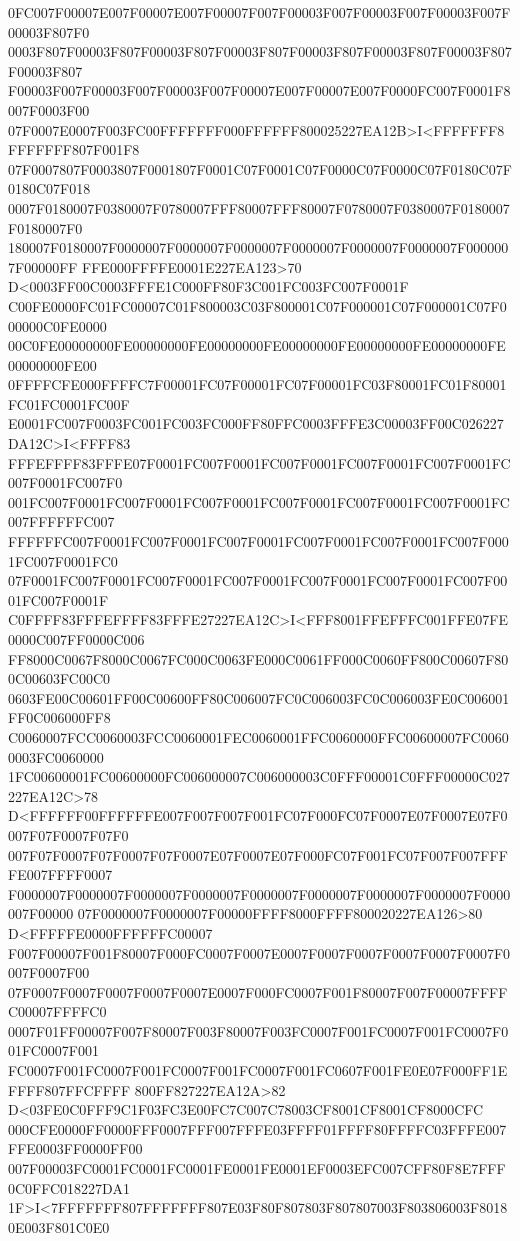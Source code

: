 0FC007F00007E007F00007E007F00007F007F00003F007F00003F007F00003F007F00003F807F0
0003F807F00003F807F00003F807F00003F807F00003F807F00003F807F00003F807F00003F807
F00003F007F00003F007F00003F007F00007E007F00007E007F0000FC007F0001F8007F0003F00
07F0007E0007F003FC00FFFFFFF000FFFFFF800025227EA12B>I<FFFFFFF8FFFFFFF807F001F8
07F0007807F0003807F0001807F0001C07F0001C07F0000C07F0000C07F0180C07F0180C07F018
0007F0180007F0380007F0780007FFF80007FFF80007F0780007F0380007F0180007F0180007F0
180007F0180007F0000007F0000007F0000007F0000007F0000007F0000007F0000007F00000FF
FFE000FFFFE0001E227EA123>70 D<0003FF00C0003FFFE1C000FF80F3C001FC003FC007F0001F
C00FE0000FC01FC00007C01F800003C03F800001C07F000001C07F000001C07F000000C0FE0000
00C0FE00000000FE00000000FE00000000FE00000000FE00000000FE00000000FE00000000FE00
0FFFFCFE000FFFFC7F00001FC07F00001FC07F00001FC03F80001FC01F80001FC01FC0001FC00F
E0001FC007F0003FC001FC003FC000FF80FFC0003FFFE3C00003FF00C026227DA12C>I<FFFF83
FFFEFFFF83FFFE07F0001FC007F0001FC007F0001FC007F0001FC007F0001FC007F0001FC007F0
001FC007F0001FC007F0001FC007F0001FC007F0001FC007F0001FC007F0001FC007FFFFFFC007
FFFFFFC007F0001FC007F0001FC007F0001FC007F0001FC007F0001FC007F0001FC007F0001FC0
07F0001FC007F0001FC007F0001FC007F0001FC007F0001FC007F0001FC007F0001FC007F0001F
C0FFFF83FFFEFFFF83FFFE27227EA12C>I<FFF8001FFEFFFC001FFE07FE0000C007FF0000C006
FF8000C0067F8000C0067FC000C0063FE000C0061FF000C0060FF800C00607F800C00603FC00C0
0603FE00C00601FF00C00600FF80C006007FC0C006003FC0C006003FE0C006001FF0C006000FF8
C0060007FCC0060003FCC0060001FEC0060001FFC0060000FFC00600007FC00600003FC0060000
1FC00600001FC00600000FC006000007C006000003C0FFF00001C0FFF00000C027227EA12C>78
D<FFFFFF00FFFFFFE007F007F007F001FC07F000FC07F0007E07F0007E07F0007F07F0007F07F0
007F07F0007F07F0007F07F0007E07F0007E07F000FC07F001FC07F007F007FFFFE007FFFF0007
F0000007F0000007F0000007F0000007F0000007F0000007F0000007F0000007F0000007F00000
07F0000007F0000007F00000FFFF8000FFFF800020227EA126>80 D<FFFFFE0000FFFFFFC00007
F007F00007F001F80007F000FC0007F0007E0007F0007F0007F0007F0007F0007F0007F0007F00
07F0007F0007F0007F0007F0007E0007F000FC0007F001F80007F007F00007FFFFC00007FFFFC0
0007F01FF00007F007F80007F003F80007F003FC0007F001FC0007F001FC0007F001FC0007F001
FC0007F001FC0007F001FC0007F001FC0007F001FC0607F001FE0E07F000FF1EFFFF807FFCFFFF
800FF827227EA12A>82 D<03FE0C0FFF9C1F03FC3E00FC7C007C78003CF8001CF8001CF8000CFC
000CFE0000FF0000FFF0007FFF007FFFE03FFFF01FFFF80FFFFC03FFFE007FFE0003FF0000FF00
007F00003FC0001FC0001FC0001FE0001FE0001EF0003EFC007CFF80F8E7FFF0C0FFC018227DA1
1F>I<7FFFFFFF807FFFFFFF807E03F80F807803F807807003F803806003F80180E003F801C0E0
